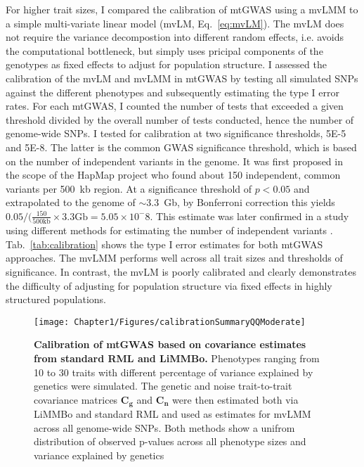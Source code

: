 For higher trait sizes, I compared the calibration of mtGWAS using a mvLMM to a simple multi-variate linear model (mvLM, Eq.~\ref{eq:mvLM}). The mvLM does not require the variance decompostion into different random effects, i.e. avoids the computational bottleneck, but simply uses pricipal components of the genotypes as fixed effects to adjust for population structure. I assessed the calibration of the mvLM and mvLMM in mtGWAS by testing all simulated SNPs against the different phenotypes and subsequently estimating the type I error rates. For each mtGWAS, I counted the number of tests that exceeded a given threshold divided by the overall number of tests conducted, hence the number of genome-wide SNPs. I tested for calibration at two  significance thresholds, 5E-5 and 5E-8.  The latter is the common GWAS significance threshold, which is based on the number of independent variants in the genome. It was first proposed in the scope of the HapMap project \citeyear{HapMap2005} who found about 150 independent, common variants per 500~kb region. At a significance threshold of \(p < 0.05\) and extrapolated to the genome of \(\sim 3.3\)~Gb, by Bonferroni correction this yields  \(  0.05/(\frac{150}{500\text{kb}} \times 3.3 \text{Gb}= 5.05 \times 10^-8\). This estimate was later confirmed in a study using different methods for estimating the number of independent variants \citep{Fadista2016}.  Tab.~\ref{tab:calibration} shows the type I error estimates for both mtGWAS approaches. The mvLMM performs well across all trait sizes and thresholds of significance. In contrast, the mvLM is poorly calibrated and clearly demonstrates the difficulty of adjusting for population structure via fixed effects in highly structured populations.  
 
\begin{figure}[hbtp]
	\centering	
	\texttt{[image: Chapter1/Figures/calibrationSummaryQQModerate]}\\
	\caption{\textbf{Calibration of mtGWAS based on covariance estimates from standard RML and LiMMBo.} Phenotypes  ranging from 10 to 30 traits with different percentage of variance explained by genetics were simulated. The genetic and noise trait-to-trait covariance matrices \(\mathbf{C_g}\) and \(\mathbf{C_n}\) were then estimated both via LiMMBo and standard RML and used as estimates for mvLMM across all genome-wide SNPs. Both methods show a unifrom distribution of observed p-values across all phenotype sizes and variance explained by genetics }
	  \label{fig:calibration}%
\end{figure}


